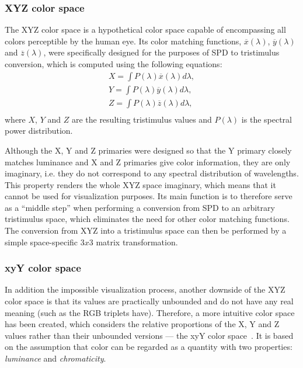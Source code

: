 \subsubsection{XYZ color space}

The XYZ color space is a hypothetical color space capable of encompassing all colors perceptible by the human eye. Its color matching functions, $\overline{x}(\lambda)$, $\overline{y}(\lambda)$ and $\overline{z}(\lambda)$, were specifically designed for the purposes of SPD to tristimulus conversion, which is computed using the following equations:
\begin{equation} \label{spdToXYZ}
	\begin{aligned}
	X=\int P(\lambda)\overline{x}(\lambda)d\lambda,\\
	Y=\int P(\lambda)\overline{y}(\lambda)d\lambda,\\
	Z=\int P(\lambda)\overline{z}(\lambda)d\lambda,\\
	\end{aligned}
\end{equation}
where $X$, $Y$ and $Z$ are the resulting tristimulus values and $P(\lambda)$ is the spectral power distribution.

Although the X, Y and Z primaries were designed so that the Y primary closely matches luminance and X and Z primaries give color information, they are only imaginary, i.e. they do not correspond to any spectral distribution of wavelengths. This property renders the whole XYZ space imaginary, which means that it cannot be used for visualization purposes. Its main function is to therefore serve as a ``middle step'' when performing a conversion from SPD to an arbitrary tristimulus space, which eliminates the need for other color matching functions. The conversion from XYZ into a tristimulus space can then be performed by a simple space-specific $3x3$ matrix transformation.

\subsubsection{xyY color space} \label{sssect:xyYcolorSpace}

In addition the impossible visualization process, another downside of the XYZ color space is that its values are practically unbounded and do not have any real meaning (such as the RGB triplets have). Therefore, a more intuitive color space has been created, which considers the relative proportions of the X, Y and Z values rather than their unbounded versions --- the xyY color space~\cite{xyYOverview}. It is based on the assumption that color can be regarded as a quantity with two properties: \emph{luminance} and \emph{chromaticity}.

